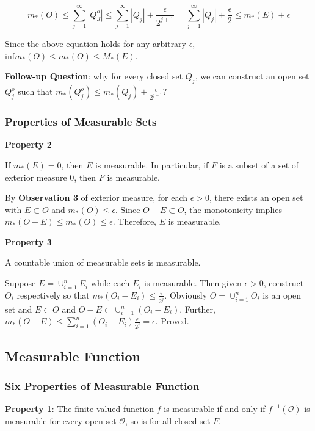 \documentclass[
]{article}
\begin{document}
\[m_*(O)\leq \sum_{j=1}^{\infty}|Q_J^o|\leq\sum_{j=1}^{\infty}|Q_j|+\frac{\epsilon}{2^{{j+1}}}=\sum_{j=1}^{\infty}|Q_j|+\frac{\epsilon}{2}\leq m_*(E)+\epsilon\]

Since the above equation holds for any arbitrary \(\epsilon\),
\(\mathrm{inf}m_*(O)\leq m_*(O)\leq M_*(E)\).

\textbf{Follow-up Question}: why for every closed set \(Q_j\), we can
construct an open set \(Q_{j}^{o}\) such that
\(m_*(Q_j^o)\leq m_*(Q_j)+\frac{\epsilon}{2^{j+1}} \)?

\hypertarget{header-n25}{%
\subsubsection{Properties of Measurable Sets}\label{header-n25}}

\textbf{Property 2}

If \(m_*(E)=0\), then \(E\) is measurable. In particular, if \(F\) is a
subset of a set of exterior measure 0, then \(F\) is measurable.

By \textbf{Observation 3} of exterior measure, for each
\(\epsilon > 0\), there exists an open set with \(E \subset O\) and
\(m_*(O)\leq \epsilon\). Since \(O-E \subset O\), the monotonicity
implies \(m_*(O-E)\leq m_*(O)\leq \epsilon\). Therefore, \(E\) is
measurable.

\textbf{Property 3}

A countable union of measurable sets is measurable.

Suppose \(E=\cup_{i=1}^nE_i\) while each \(E_i\) is measurable. Then
given \(\epsilon>0\), construct \(O_i\) respectively so that
\(m_*(O_i-E_i)\leq \frac{\epsilon}{2^j}\). Obviously
\(O=\cup_{i=1}^nO_i\) is an open set and \(E\subset O\) and
\(O-E\subset \cup_{i=1}^n(O_i-E_i)\). Further,
\(m_*(O-E)\leq \sum_{i=1}^n(O_i-E_i)\frac{\epsilon}{2^j}=\epsilon\).
Proved.

\subsection{Measurable Function}
\subsubsection{Six Properties of Measurable Function}

\textbf{Property 1}: The finite-valued function \(f\) is measurable if and only if
\(f^{-1}(\mathcal{O})\) is measurable for every open set \(\mathcal{O}\), so is for
all closed set \(F\).
\end{document}
